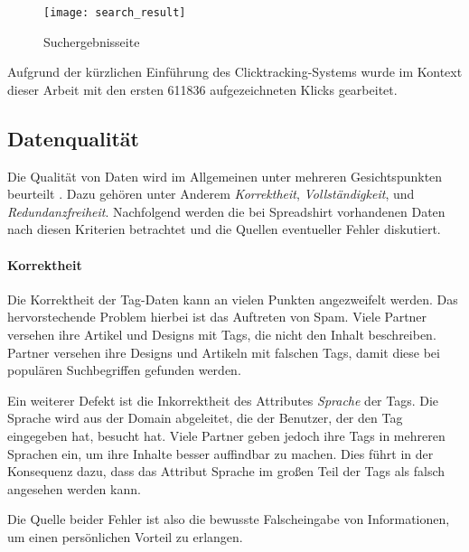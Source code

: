 \begin{figure}[h]
\centering
\texttt{[image: search\_result]}
\caption{Suchergebnisseite}
\label{fig:search_result}
\end{figure}

Aufgrund der kürzlichen Einführung des Clicktracking-Systems wurde im Kontext dieser Arbeit mit den ersten \num{611836} aufgezeichneten Klicks gearbeitet.

\subsection{Datenqualität}

Die Qualität von Daten wird im Allgemeinen unter mehreren Gesichtspunkten beurteilt \cite{hkp2012}. Dazu gehören unter Anderem \emph{Korrektheit}, \emph{Vollständigkeit}, und \emph{Redundanzfreiheit}. Nachfolgend werden die bei Spreadshirt vorhandenen Daten nach diesen Kriterien betrachtet und die Quellen eventueller Fehler \cite[43 ff]{jo2003} diskutiert.

\paragraph{Korrektheit}

Die Korrektheit der Tag-Daten kann an vielen Punkten angezweifelt werden. Das hervorstechende Problem hierbei ist das Auftreten von Spam. Viele Partner versehen ihre Artikel und Designs mit Tags, die nicht den Inhalt beschreiben. Partner versehen ihre Designs und Artikeln mit falschen Tags, damit diese bei populären Suchbegriffen gefunden werden.

Ein weiterer Defekt ist die Inkorrektheit des Attributes \emph{Sprache} der Tags. Die Sprache wird aus der Domain abgeleitet, die der Benutzer, der den Tag eingegeben hat, besucht hat. Viele Partner geben jedoch ihre Tags in mehreren Sprachen ein, um ihre Inhalte besser auffindbar zu machen. Dies führt in der Konsequenz dazu, dass das Attribut Sprache im großen Teil der Tags als falsch angesehen werden kann.

Die Quelle beider Fehler ist also die bewusste Falscheingabe von Informationen, um einen persönlichen Vorteil zu erlangen.
                                                                                                                                                                                                                                                                                                                                                                                                              

